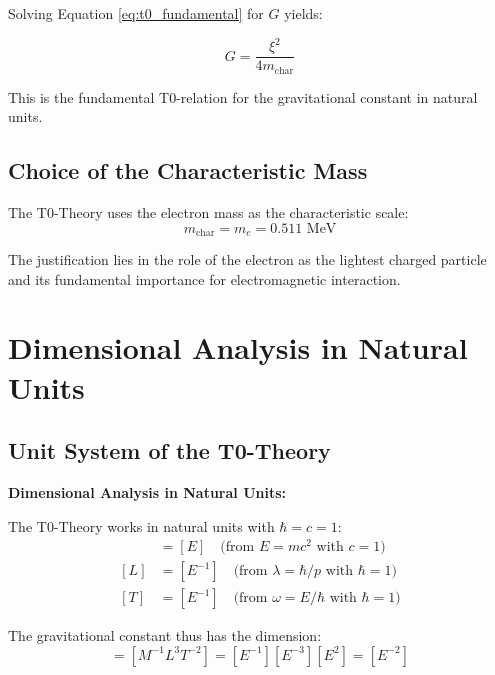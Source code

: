 \documentclass[12pt,a4paper]{article}
\begin{document}
	Solving Equation \eqref{eq:t0_fundamental} for $G$ yields:
	
	\begin{equation}
		G = \frac{\xi^2}{4 m_{\text{char}}}
		\label{eq:g_fundamental}
	\end{equation}
	
	This is the fundamental T0-relation for the gravitational constant in natural units.
	
	\subsection{Choice of the Characteristic Mass}
	
	The T0-Theory uses the electron mass as the characteristic scale:
	\begin{equation}
		m_{\text{char}} = m_e = 0.511 \text{ MeV}
		\label{eq:characteristic_mass}
	\end{equation}
	
	The justification lies in the role of the electron as the lightest charged particle and its fundamental importance for electromagnetic interaction.
	
	\section{Dimensional Analysis in Natural Units}
	
	\subsection{Unit System of the T0-Theory}
	
	\begin{dimensional}
		\textbf{Dimensional Analysis in Natural Units:}
		
		The T0-Theory works in natural units with $\hbar = c = 1$:
		\begin{align}
			[M] &= [E] \quad \text{(from } E = mc^2 \text{ with } c = 1\text{)} \\
			[L] &= [E^{-1}] \quad \text{(from } \lambda = \hbar/p \text{ with } \hbar = 1\text{)} \\
			[T] &= [E^{-1}] \quad \text{(from } \omega = E/\hbar \text{ with } \hbar = 1\text{)}
		\end{align}
		
		The gravitational constant thus has the dimension:
		\begin{equation}
			[G] = [M^{-1}L^3T^{-2}] = [E^{-1}][E^{-3}][E^2] = [E^{-2}]
		\end{equation}
	\end{dimensional}
	
\end{document}
